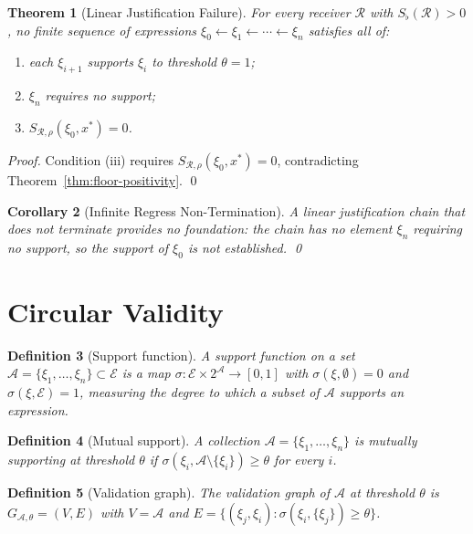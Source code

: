 \documentclass[twocolumn,a4paper]{article}
\newtheorem{theorem}{Theorem}[section]
\newtheorem{corollary}[theorem]{Corollary}
\newtheorem{definition}[theorem]{Definition}
\newcommand{\Expr}{\mathcal{E}}
\newcommand{\receiver}{\mathcal{R}}
\newcommand{\Sscalar}{S}
\newcommand{\Sfloor}{S_{\flat}}
\begin{document}
\begin{theorem}[Linear Justification Failure]
\label{thm:linear-failure}
For every receiver $\receiver$ with $\Sfloor(\receiver)>0$, no finite sequence of expressions $\xi_{0}\leftarrow\xi_{1}\leftarrow\cdots\leftarrow\xi_{n}$ satisfies all of:
\begin{enumerate}[nosep,label=(\roman*)]
\item each $\xi_{i+1}$ supports $\xi_{i}$ to threshold $\theta=1$;
\item $\xi_{n}$ requires no support;
\item $\Sscalar_{\receiver,\rho}(\xi_{0},x^{*})=0$.
\end{enumerate}
\end{theorem}

\begin{proof}
Condition (iii) requires $\Sscalar_{\receiver,\rho}(\xi_{0},x^{*})=0$, contradicting Theorem~\ref{thm:floor-positivity}. \qed
\end{proof}

\begin{corollary}[Infinite Regress Non-Termination]
\label{cor:infinite-regress}
A linear justification chain that does not terminate provides no foundation: the chain has no element $\xi_{n}$ requiring no support, so the support of $\xi_{0}$ is not established. \qed
\end{corollary}

\section{Circular Validity}
\label{sec:circular-validity}

\begin{definition}[Support function]
\label{def:support}
A \emph{support function} on a set $\mathcal{A}=\{\xi_{1},\ldots,\xi_{n}\}\subset\Expr$ is a map $\sigma\colon\Expr\times 2^{\mathcal{A}}\to[0,1]$ with $\sigma(\xi,\emptyset)=0$ and $\sigma(\xi,\Expr)=1$, measuring the degree to which a subset of $\mathcal{A}$ supports an expression.
\end{definition}

\begin{definition}[Mutual support]
\label{def:mutual-support}
A collection $\mathcal{A}=\{\xi_{1},\ldots,\xi_{n}\}$ is \emph{mutually supporting at threshold $\theta$} if $\sigma(\xi_{i},\mathcal{A}\setminus\{\xi_{i}\})\geq\theta$ for every $i$.
\end{definition}

\begin{definition}[Validation graph]
\label{def:validation-graph}
The \emph{validation graph} of $\mathcal{A}$ at threshold $\theta$ is $G_{\mathcal{A},\theta}=(V,E)$ with $V=\mathcal{A}$ and $E=\{(\xi_{j},\xi_{i})\colon\sigma(\xi_{i},\{\xi_{j}\})\geq\theta\}$.
\end{definition}
\end{document}

